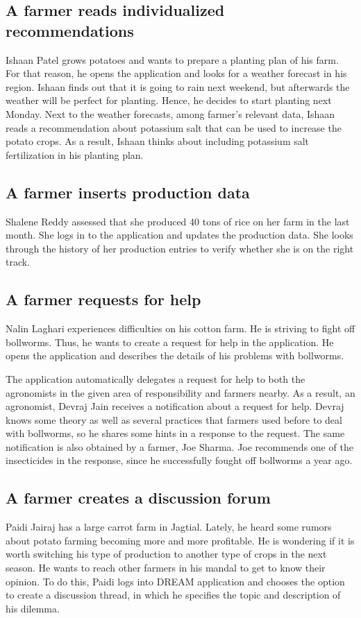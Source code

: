 \subsection*{A farmer reads individualized recommendations}
Ishaan Patel grows potatoes and wants to prepare a planting plan of his farm. For that reason, he opens the application and looks for a weather forecast in his region. Ishaan finds out that it is going to rain next weekend, but afterwards the weather will be perfect for planting. Hence, he decides to start planting next Monday. Next to the weather forecasts, among farmer's relevant data, Ishaan reads a recommendation about potassium salt that can be used to increase the potato crops. As a result, Ishaan thinks about including potassium salt fertilization in his planting plan. 

\subsection*{A farmer inserts production data}
Shalene Reddy assessed that she produced 40 tons of rice on her farm in the last month. She logs in to the application and updates the production data. She looks through the history of her production entries to verify whether she is on the right track. 

\subsection*{A farmer requests for help}
Nalin Laghari experiences difficulties on his cotton farm. He is striving to fight off bollworms. Thus, he wants to create a request for help in the application. He opens the application and describes the details of his problems with bollworms.

The application automatically delegates a request for help to both the agronomists in the given area of responsibility and farmers nearby. As a result, an agronomist, Devraj Jain receives a notification about a request for help. Devraj knows some theory as well as several practices that farmers used before to deal with bollworms, so he shares some hints in a response to the request. The same notification is also obtained by a farmer, Joe Sharma. Joe recommends one of the insecticides in the response, since he successfully fought off bollworms a year ago.

\subsection*{A farmer creates a discussion forum}
Paidi Jairaj has a large carrot farm in Jagtial. Lately, he heard some rumors about potato farming becoming more and more profitable. He is wondering if it is worth switching his type of production to another type of crops in the next season. He wants to reach other farmers in his mandal to get to know their opinion. To do this, Paidi logs into DREAM application and chooses the option to create a discussion thread, in which he specifies the topic and description of his dilemma.

